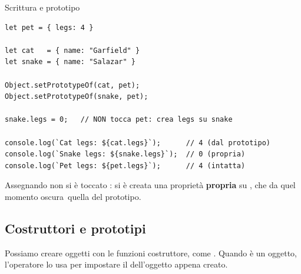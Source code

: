 \begin{esempio}{Scrittura e prototipo}
\begin{affianco}[0.55][c]
\begin{lstlisting}[style=js, name=scrittura-proto.js]
let pet = { legs: 4 }

let cat   = { name: "Garfield" }
let snake = { name: "Salazar" }

Object.setPrototypeOf(cat, pet);
Object.setPrototypeOf(snake, pet);

snake.legs = 0;   // NON tocca pet: crea legs su snake

console.log(`Cat legs: ${cat.legs}`);      // 4 (dal prototipo)
console.log(`Snake legs: ${snake.legs}`);  // 0 (propria)
console.log(`Pet legs: ${pet.legs}`);      // 4 (intatta)
\end{lstlisting}
\risultato
\begin{immagine}
\end{immagine}
\end{affianco}

Assegnando  non si è toccato : si è creata una
proprietà \textbf{propria} su , che da quel momento
\guillemotleft oscura\guillemotright\ quella del prototipo.
\end{esempio}

\subsection{Costruttori e prototipi}

Possiamo creare oggetti con le funzioni costruttore, come .
Quando  è un oggetto, l'operatore  lo usa per
impostare il \code{[[Prototype]]} dell'oggetto appena creato.

